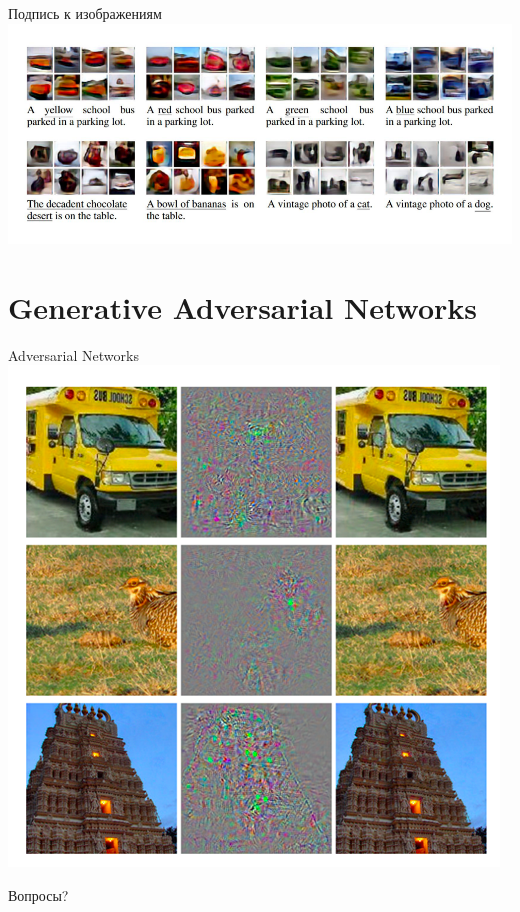 \documentclass[10pt]{beamer}
\begin{document}
{
\begin{frame}{Подпись к изображениям}
  \centering 
  \includegraphics[width=0.9 \textwidth, keepaspectratio = true]{images/image_gen}   
\end{frame}
}

\section{Generative Adversarial Networks}

{
\begin{frame}{Adversarial Networks}
  \centering 
  \includegraphics[height=0.9 \textheight, width=0.9 \textwidth, keepaspectratio = true]{images/GAN}   
\end{frame}
}

\begin{frame}[standout]
  Вопросы?
\end{frame}
\end{document}
